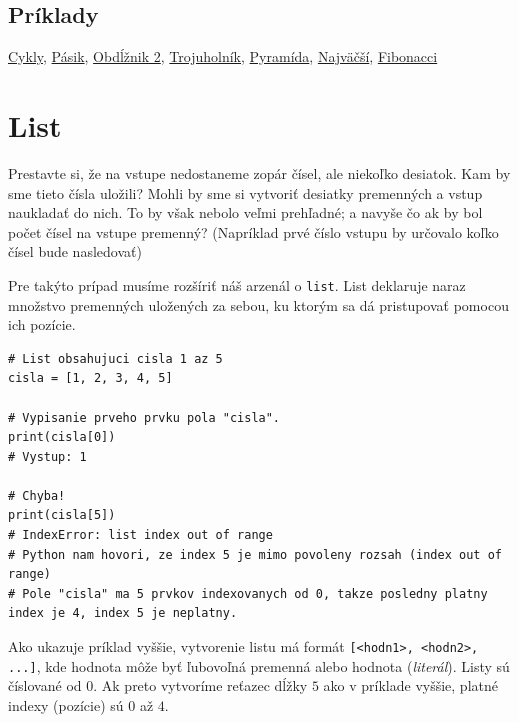 \subsection{Príklady}
\href{https://testovac.ksp.sk/tasks/ls-uvod-cykly/}{Cykly},
\href{https://testovac.ksp.sk/tasks/ls-uvod-pasik/}{Pásik},
\href{https://testovac.ksp.sk/tasks/ls-uvod-obdlznik2/}{Obdĺžnik 2},
\href{https://testovac.ksp.sk/tasks/ls-uvod-trojuholnik/}{Trojuholník},
\href{https://testovac.ksp.sk/tasks/ls-uvod-pyramida/}{Pyramída},
\href{https://testovac.ksp.sk/tasks/ls-uvod-najvacsi/}{Najväčší},
\href{https://testovac.ksp.sk/tasks/ls-uvod-fibonacci/}{Fibonacci}

\section{List}

Prestavte si, že na vstupe nedostaneme zopár čísel, ale niekoľko desiatok. Kam by sme tieto čísla uložili? Mohli by sme si vytvoriť desiatky premenných a vstup naukladať do nich. To by však nebolo veľmi prehľadné; a navyše čo ak by bol počet čísel na vstupe premenný? (Napríklad prvé číslo vstupu by určovalo koľko čísel bude nasledovať)

Pre takýto prípad musíme rozšíriť náš arzenál o \texttt{list}. List deklaruje naraz množstvo premenných uložených za sebou, ku ktorým sa dá pristupovať pomocou ich pozície.
\begin{lstlisting}
# List obsahujuci cisla 1 az 5
cisla = [1, 2, 3, 4, 5]

# Vypisanie prveho prvku pola "cisla".
print(cisla[0])
# Vystup: 1

# Chyba!
print(cisla[5])
# IndexError: list index out of range
# Python nam hovori, ze index 5 je mimo povoleny rozsah (index out of range)
# Pole "cisla" ma 5 prvkov indexovanych od 0, takze posledny platny index je 4, index 5 je neplatny.
\end{lstlisting}

Ako ukazuje príklad vyššie, vytvorenie listu má formát \texttt{[<hodn1>, <hodn2>, ...]}, kde hodnota môže byť ľubovoľná premenná alebo hodnota (\textit{literál}). Listy sú číslované od $0$. Ak preto vytvoríme reťazec dĺžky $5$ ako v príklade vyššie, platné indexy (pozície) sú $0$ až $4$. 

